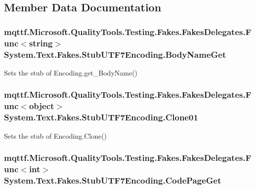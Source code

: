 \subsection{Member Data Documentation}
\hypertarget{class_system_1_1_text_1_1_fakes_1_1_stub_u_t_f7_encoding_abd4520c8f68c5886ec0c4ae8a28598cf}{
\subsubsection[{Body\-Name\-Get}]{\setlength{\rightskip}{0pt plus 5cm}mqttf.\-Microsoft.\-Quality\-Tools.\-Testing.\-Fakes.\-Fakes\-Delegates.\-Func$<$string$>$ System.\-Text.\-Fakes.\-Stub\-U\-T\-F7\-Encoding.\-Body\-Name\-Get}}\label{class_system_1_1_text_1_1_fakes_1_1_stub_u_t_f7_encoding_abd4520c8f68c5886ec0c4ae8a28598cf}


Sets the stub of Encoding.\-get\-\_\-\-Body\-Name()

\hypertarget{class_system_1_1_text_1_1_fakes_1_1_stub_u_t_f7_encoding_af10fc67539b39b69953ef4dfc1e16384}{
\subsubsection[{Clone01}]{\setlength{\rightskip}{0pt plus 5cm}mqttf.\-Microsoft.\-Quality\-Tools.\-Testing.\-Fakes.\-Fakes\-Delegates.\-Func$<$object$>$ System.\-Text.\-Fakes.\-Stub\-U\-T\-F7\-Encoding.\-Clone01}}\label{class_system_1_1_text_1_1_fakes_1_1_stub_u_t_f7_encoding_af10fc67539b39b69953ef4dfc1e16384}


Sets the stub of Encoding.\-Clone()

\hypertarget{class_system_1_1_text_1_1_fakes_1_1_stub_u_t_f7_encoding_a9433e33eb3e128aaf16e60a233ec975e}{
\subsubsection[{Code\-Page\-Get}]{\setlength{\rightskip}{0pt plus 5cm}mqttf.\-Microsoft.\-Quality\-Tools.\-Testing.\-Fakes.\-Fakes\-Delegates.\-Func$<$int$>$ System.\-Text.\-Fakes.\-Stub\-U\-T\-F7\-Encoding.\-Code\-Page\-Get}}\label{class_system_1_1_text_1_1_fakes_1_1_stub_u_t_f7_encoding_a9433e33eb3e128aaf16e60a233ec975e}



